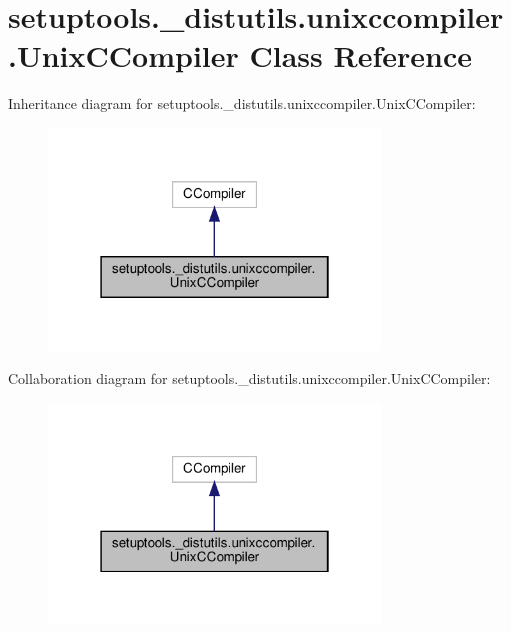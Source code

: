 \hypertarget{classsetuptools_1_1__distutils_1_1unixccompiler_1_1UnixCCompiler}{}\section{setuptools.\+\_\+distutils.\+unixccompiler.\+Unix\+C\+Compiler Class Reference}
\label{classsetuptools_1_1__distutils_1_1unixccompiler_1_1UnixCCompiler}


Inheritance diagram for setuptools.\+\_\+distutils.\+unixccompiler.\+Unix\+C\+Compiler\+:
\nopagebreak
\begin{figure}[H]
\begin{center}
\leavevmode
\includegraphics[width=250pt]{classsetuptools_1_1__distutils_1_1unixccompiler_1_1UnixCCompiler__inherit__graph}
\end{center}
\end{figure}


Collaboration diagram for setuptools.\+\_\+distutils.\+unixccompiler.\+Unix\+C\+Compiler\+:
\nopagebreak
\begin{figure}[H]
\begin{center}
\leavevmode
\includegraphics[width=250pt]{classsetuptools_1_1__distutils_1_1unixccompiler_1_1UnixCCompiler__coll__graph}
\end{center}
\end{figure}
